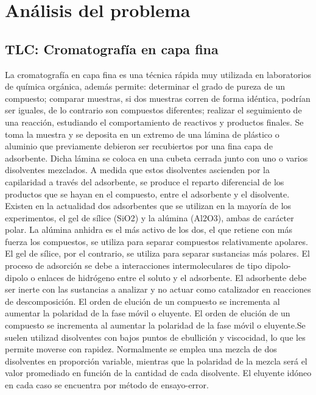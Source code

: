 \chapter{An\'alisis del problema}

\section{TLC: Cromatograf\'ia en capa fina}
La cromatograf\'ia en capa fina es una t\'ecnica r\'apida muy utilizada en laboratorios de qu\'imica org\'anica, adem\'as permite: determinar el grado de pureza de un compuesto; comparar muestras, si dos muestras corren de forma id\'entica, podr\'ian ser iguales, de lo contrario son compuestos diferentes; realizar el seguimiento de una reacci\'on, estudiando el comportamiento de reactivos y productos finales.
Se toma la muestra y se deposita en un extremo de una l\'amina de pl\'astico o aluminio que previamente debieron ser recubiertos por una fina capa de adsorbente. Dicha l\'amina se coloca en una cubeta cerrada junto con uno o varios disolventes mezclados. A medida que estos disolventes ascienden por la capilaridad a trav\'es del adsorbente, se produce el reparto diferencial de los productos que se hayan en el compuesto, entre el adsorbente y el disolvente.
Existen en la actualidad dos adsorbentes que se utilizan en la mayor\'ia de los experimentos, el gel de s\'ilice (SiO2) y la al\'umina (Al2O3), ambas de car\'acter polar. La al\'umina anhidra es el m\'as activo de los dos, el que retiene con m\'as fuerza los compuestos, se utiliza para separar compuestos relativamente apolares. El gel de s\'ilice, por el contrario, se utiliza para separar sustancias m\'as polares. El proceso de adsorci\'on se debe a interacciones intermoleculares de tipo dipolo-dipolo o enlaces de hidr\'ogeno entre el soluto y el adsorbente. El adsorbente debe ser inerte con las sustancias a analizar y no actuar como catalizador en reacciones de descomposici\'on. El orden de eluci\'on de un compuesto se incrementa al aumentar la polaridad de la fase m\'ovil o eluyente.
El orden de eluci\'on de un compuesto se incrementa al aumentar la polaridad de la fase m\'ovil o eluyente.Se suelen utilizad disolventes con bajos puntos de ebullici\'on y viscocidad, lo que les permite moverse con rapidez. Normalmente se emplea una mezcla de dos disolventes en proporci\'on variable, mientras que la polaridad de la mezcla ser\'a el valor promediado en funci\'on de la cantidad de cada disolvente. El eluyente id\'oneo en cada caso se encuentra por m\'etodo de ensayo-error.
